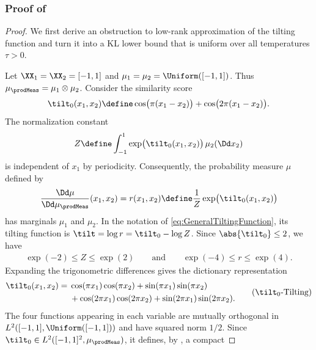 \documentclass{article}
\begin{document}
\subsubsection{Proof of }
\label{eq:NegativeExampleDimensionalityLatentSpace-PROOF}
\begin{proof}
 We first derive an obstruction to low-rank approximation of the tilting
 function and turn it into a KL lower bound that is uniform over all
 temperatures $\tau>0$.

 Let $\XX_1=\XX_2=[-1,1]$ and $\mu_1=\mu_2=\Uniform([-1,1])$. Thus
 $\mu_\prodMeas=\mu_1\otimes\mu_2$. Consider the similarity score
 \begin{align*}
  \tilt_0(x_1,x_2)
  \define \cos\bigl(\pi(x_1-x_2)\bigr)
  +\cos\bigl(2\pi(x_1-x_2)\bigr).
 \end{align*}
 The normalization constant
 \begin{align*}
  Z \define \int_{-1}^1 \exp\bigl(\tilt_0(x_1,x_2)\bigr)\,\mu_2(\Dd x_2)
 \end{align*}
 is independent of $x_1$ by periodicity. Consequently, the probability
 measure $\mu$ defined by
 \begin{align*}
  \frac{\Dd\mu}{\Dd\mu_\prodMeas}(x_1,x_2)
  =r(x_1,x_2)\define \frac{1}{Z}\exp\bigl(\tilt_0(x_1,x_2)\bigr)
 \end{align*}
 has marginals $\mu_1$ and $\mu_2$. In the notation of
 \eqref{eq:GeneralTiltingFunction}, its tilting function is
 $\tilt=\log r=\tilt_0-\log Z$. Since $\abs{\tilt_0}\leq2$, we have
 \begin{align*}
  \exp(-2)\leq Z\leq\exp(2)
  \qquad\text{and}\qquad
  \exp(-4)\leq r\leq\exp(4).
 \end{align*}
 Expanding the trigonometric differences gives the dictionary representation
 \begin{align}
  \begin{aligned}
   \tilt_0(x_1,x_2)
   ={} & \cos(\pi x_1)\cos(\pi x_2)
   +\sin(\pi x_1)\sin(\pi x_2)         \\
       & +\cos(2\pi x_1)\cos(2\pi x_2)
   +\sin(2\pi x_1)\sin(2\pi x_2).
  \end{aligned}
  \tag{\ensuremath{\tilt_0}-Tilting}
  \label{eq:FourierDictionaryLatentDimension}
 \end{align}
 The four functions appearing in each variable are mutually orthogonal in
 $L^2([-1,1],\Uniform([-1,1]))$ and have squared norm $1/2$.
 Since $\tilt_0\in L^2([-1,1]^2,\mu_\prodMeas)$, it defines, by
 \cite[Thm. VI.6.3]{wernerFunktionalanalysis2011}, a compact

\end{proof}
\end{document}
